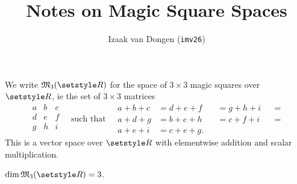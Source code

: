 \documentclass[fleqn,a4paper,11pt]{article}
\title{Notes on Magic Square Spaces}
\author{\texorpdfstring{Izaak van Dongen (\texttt{imv26})}
                       {Izaak van Dongen (imv26)}}
\date{}
\begin{document}
\maketitle

We write \(\mathfrak M_3(\R)\) for the space of \(3 \times 3\) magic squares
over \(\R\), ie the set of \(3 \times 3\) matrices
\begin{equation*}
 \begin{array}{c|c|c}
  a & b & c \\ \hline
  d & e & f \\ \hline
  g & h & i \\
 \end{array} \quad \text{such that} \quad
 \begin{alignedat}{3}
  a + b + c &= d + e + f &&{}= g + h + i &&{}= \\
  a + d + g &= b + e + h &&{}= c + f + i &&{}= \\
  a + e + i &= c + e + g.
 \end{alignedat}
\end{equation*}
This is a vector space over \(\R\) with elementwise addition and scalar
multiplication.
\begin{theorem}
 \(\dim \mathfrak M_3(\R) = 3\).
\end{theorem}
\end{document}
